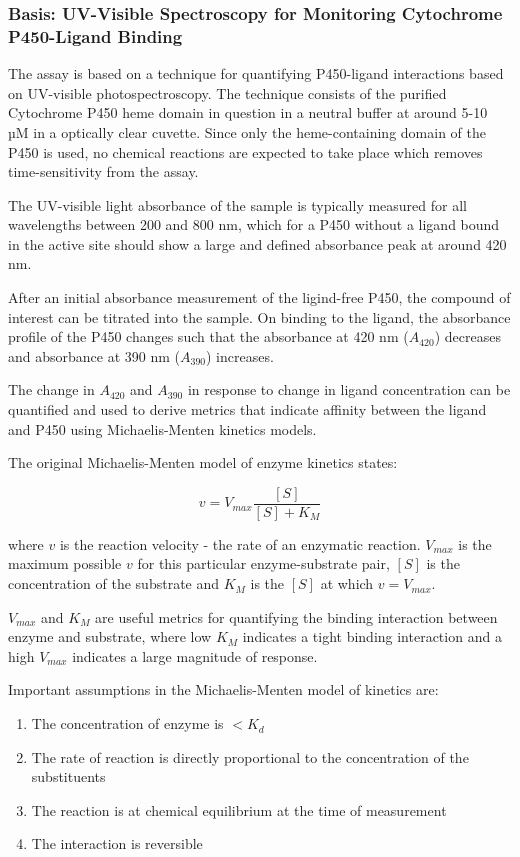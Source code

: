 \documentclass{article}
\begin{document}
\subsubsection{Basis: UV-Visible Spectroscopy for Monitoring Cytochrome P450-Ligand Binding}

The assay is based on a technique for quantifying P450-ligand interactions based on UV-visible photospectroscopy.
The technique consists of the purified Cytochrome P450 heme domain in question in a neutral buffer at around 5-10 µM in a optically clear cuvette.
Since only the heme-containing domain of the P450 is used, no chemical reactions are expected to take place which removes time-sensitivity from the assay.
\par

The UV-visible light absorbance of the sample is typically measured for all wavelengths between 200 and 800 nm, which for a P450 without a ligand bound in the active site should show a large and defined absorbance peak at around 420 nm.
\par
After an initial absorbance measurement of the ligind-free P450, the compound of interest can be titrated into the sample.
On binding to the ligand, the absorbance profile of the P450 changes such that the absorbance at 420 nm ($A_{420}$) decreases and absorbance at 390 nm ($A_{390}$) increases.
\par
The change in $A_{420}$ and $A_{390}$ in response to change in ligand concentration can be quantified and used to derive metrics that indicate affinity between the ligand and P450 using Michaelis-Menten kinetics models.
\par
The original Michaelis-Menten model of enzyme kinetics states:

$$ v = V_{max} \frac{[S]}{[S] + K_M} $$

where $v$ is the reaction velocity - the rate of an enzymatic reaction. 
$V_{max}$ is the maximum possible $v$ for this particular enzyme-substrate pair, $[S]$ is the concentration of the substrate and $K_M$ is the $[S]$ at which $v = V_{max}$.
\par
$V_{max}$ and $K_M$ are useful metrics for quantifying the binding interaction between enzyme and substrate, where low $K_M$ indicates a tight binding interaction and a high $V_{max}$ indicates a large magnitude of response.

Important assumptions in the Michaelis-Menten model of kinetics are:

\begin{enumerate}
	\item The concentration of enzyme is $< K_d$ 
	\item The rate of reaction is directly proportional to the concentration of the substituents
	\item The reaction is at chemical equilibrium at the time of measurement
	\item The interaction is reversible
\end{enumerate}
\end{document}
